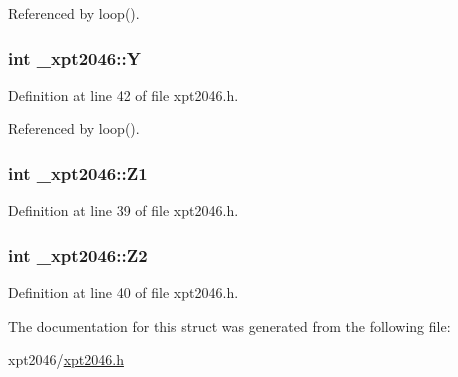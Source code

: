 Referenced by loop().

\subsubsection[{\texorpdfstring{Y}{Y}}]{\setlength{\rightskip}{0pt plus 5cm}int \+\_\+xpt2046\+::Y}\hypertarget{struct__xpt2046_a246ecf319439bdb35f405238c93a0868}{}\label{struct__xpt2046_a246ecf319439bdb35f405238c93a0868}


Definition at line 42 of file xpt2046.\+h.



Referenced by loop().

\subsubsection[{\texorpdfstring{Z1}{Z1}}]{\setlength{\rightskip}{0pt plus 5cm}int \+\_\+xpt2046\+::\+Z1}\hypertarget{struct__xpt2046_a3d4ffe11b35c91513c5c90b0b1d59f44}{}\label{struct__xpt2046_a3d4ffe11b35c91513c5c90b0b1d59f44}


Definition at line 39 of file xpt2046.\+h.

\subsubsection[{\texorpdfstring{Z2}{Z2}}]{\setlength{\rightskip}{0pt plus 5cm}int \+\_\+xpt2046\+::\+Z2}\hypertarget{struct__xpt2046_af0cfbd929b6b3ae00d926aed6bd2dbcf}{}\label{struct__xpt2046_af0cfbd929b6b3ae00d926aed6bd2dbcf}


Definition at line 40 of file xpt2046.\+h.



The documentation for this struct was generated from the following file\+:\begin{DoxyCompactItemize}
\item 
xpt2046/\hyperlink{xpt2046_8h}{xpt2046.\+h}\end{DoxyCompactItemize}
